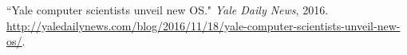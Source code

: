 \documentclass[a4paper, 10pt]{article}
\begin{document}
\begin{footnotesize}
\begin{thebibliography}{}
``Yale computer scientists unveil new OS." \emph{Yale Daily News}, 2016.
\url{http://yaledailynews.com/blog/2016/11/18/yale-computer-scientists-unveil-new-os/}.


\begin{comment}
\bibitem[7]{sel4}
G. Klein, K. Elphinstone, G. Heiser, J. Andronick,
D. Cock, P. Derrin, D. Elkaduwe, K. Engelhardt,
R. Kolanski, M. Norrish, T. Sewell, H. Tuch, and
S. Winwood. ``seL4: Formal verification of an OS
kernel." In 22nd ACM Symposium on Operating
Systems Principles (SOSP 09).

\bibitem[8]{fscq}
H. Chen, D. Ziegler, T. Chajed, A. Chlipala, M. F.
Kaashoek, and N. Zeldovich. ``Using Crash Hoare
logic for certifying the FSCQ file system." In
25th ACM Symposium on Operating System Principles
(SOSP 15).

\bibitem[9]{apsys}
S. Peters, A. Danis, K. Elphinstone, and G. Heiser.
``For a microkernel, a big lock is fine." In 
Asia Pacific Workshop on Systems (APSys 15).

\bibitem[10]{coq}
The Coq proof assistant. The Coq development team.  \url{http://coq.
inria.fr}.
\end{comment}



\end{thebibliography}
\end{footnotesize}
\end{document}
